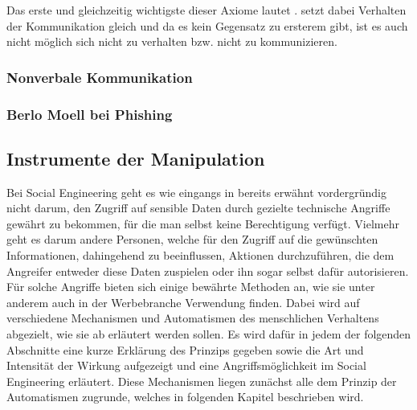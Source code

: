 Das erste und gleichzeitig wichtigste dieser Axiome lautet .
 setzt dabei Verhalten der Kommunikation gleich und da es kein Gegensatz zu ersterem gibt, ist es auch nicht möglich sich nicht zu verhalten bzw. nicht zu kommunizieren.

\cite{watzlawick}
\cite{grundlagen-der-kommunikation}

\subsubsection{Nonverbale Kommunikation}

\cite{grundlagen-der-kommunikation}

\subsubsection{Berlo Moell bei Phishing}

\subsection{Instrumente der Manipulation}\label{sec:instrumente_der_manipulation}
Bei Social Engineering geht es wie eingangs in  bereits erwähnt vordergründig
nicht darum, den Zugriff auf sensible Daten durch gezielte technische Angriffe gewährt zu bekommen,
für die man selbst keine Berechtigung verfügt.
Vielmehr geht es darum andere Personen, welche für den Zugriff auf die gewünschten Informationen, dahingehend
zu beeinflussen, Aktionen durchzuführen, die dem Angreifer entweder diese Daten zuspielen oder ihn sogar selbst dafür autorisieren.
Für solche Angriffe bieten sich einige bewährte Methoden an, wie sie unter anderem auch in der Werbebranche
Verwendung finden.
Dabei wird auf verschiedene Mechanismen und Automatismen des menschlichen Verhaltens abgezielt, wie sie ab  erläutert werden sollen.
Es wird dafür in jedem der folgenden Abschnitte eine kurze Erklärung des Prinzips gegeben sowie die Art und
Intensität der Wirkung aufgezeigt und eine Angriffsmöglichkeit im Social Engineering erläutert.
Diese Mechanismen liegen zunächst alle dem Prinzip der Automatismen zugrunde, welches in folgenden Kapitel beschrieben wird.

